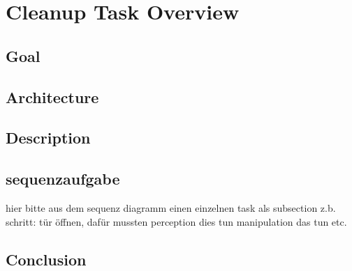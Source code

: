 \documentclass[main.tex]{subfiles}
\begin{document}
	\begingroup

	\renewcommand{\cleardoublepage}{}

	\renewcommand{\clearpage}{}

	\chapter{Cleanup Task Overview}

		\chapterauthor{}
		
		\section{Goal}
		
		\section{Architecture}
		
		\section{Description}
	  	
	  	\section{sequenzaufgabe}
		hier bitte aus dem sequenz diagramm einen einzelnen task als subsection z.b. schritt: tür öffnen, dafür mussten perception dies tun manipulation das tun etc.
		
		\section{Conclusion}
		
		
	\endgroup
\end{document}
